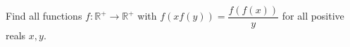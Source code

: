 Find all functions $f:\mathbb R^+\to\mathbb R^+$ with $f(xf(y))=\dfrac{f(f(x))}y$ for all positive reals $x,y$.
